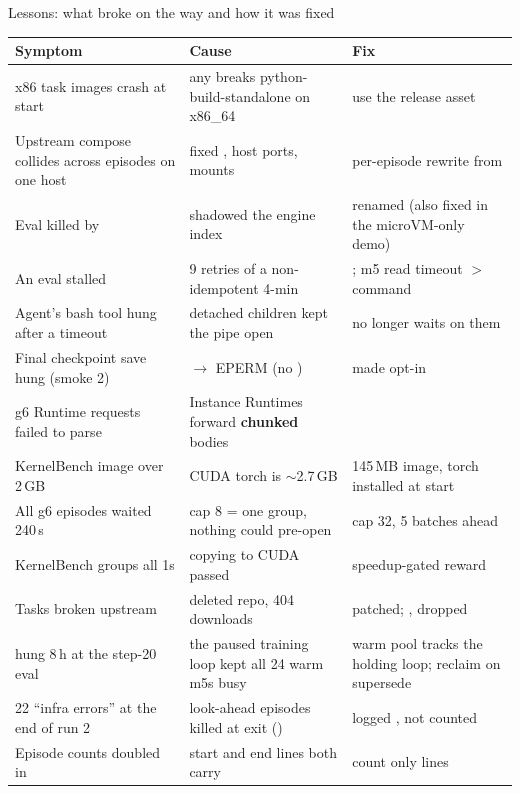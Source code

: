 \begin{frame}{Lessons: what broke on the way and how it was fixed}
\tiny\setlength{\tabcolsep}{3pt}
\begin{tabularx}{\textwidth}{@{}P{0.30\textwidth}YY@{}}
\toprule
\textbf{Symptom} & \textbf{Cause} & \textbf{Fix}\\
\midrule
x86 task images crash at start & any  breaks python-build-standalone on x86\_64 & use the  release asset\\
Upstream compose collides across episodes on one host & fixed , host ports,  mounts & per-episode rewrite from \\
Eval killed by  &  shadowed the engine index & renamed (also fixed in the microVM-only demo)\\
An eval stalled & 9 retries of a non-idempotent 4-min  & ; m5 read timeout $>$ command\\
Agent's bash tool hung after a timeout & detached children kept the pipe open &  no longer waits on them\\
Final checkpoint save hung (smoke 2) &  $\rightarrow$  EPERM (no ) &  made opt-in\\
g6 Runtime requests failed to parse & Instance Runtimes forward \textbf{chunked} bodies & \\
KernelBench image over 2\,GB & CUDA torch is $\sim$2.7\,GB & 145\,MB image, torch installed at start\\
All g6 episodes waited 240\,s & cap 8 = one group, nothing could pre-open & cap 32, 5 batches ahead\\
KernelBench groups all 1s & copying  to CUDA passed & speedup-gated reward\\
Tasks broken upstream & deleted repo, 404 downloads &  patched; ,  dropped\\
 hung 8\,h at the step-20 eval & the paused training loop kept all 24 warm m5s busy & warm pool tracks the holding loop; reclaim on supersede\\
22 ``infra errors'' at the end of run 2 & look-ahead episodes killed at exit () & logged , not counted\\
Episode counts doubled in  & start and end lines both carry  & count only  lines\\
\bottomrule
\end{tabularx}
\end{frame}

